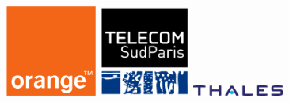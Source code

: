 \begin{figure}[h]
\vfill
\begin{center}
\parbox{3cm}{\includegraphics[width=3cm]{_frontmatter/logos/orange}}
\hfill
\parbox{3cm}{\includegraphics[width=3cm]{_frontmatter/logos/tsp}}
\hfill
\parbox{3cm}{\includegraphics[width=3cm]{_frontmatter/logos/thales}}
\end{center}
\end{figure}


